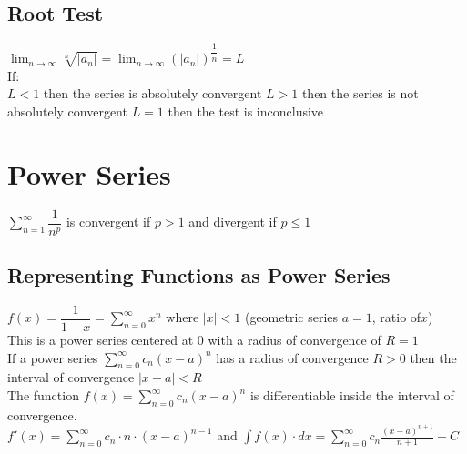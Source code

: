 \documentclass{article}
\begin{document}
\subsection*{Root Test}
$\displaystyle \lim_{n\to\infty}\sqrt[n]{|a_n|}=\lim_{n\to\infty}(|a_n|)^{\dfrac{1}{n} }=L$\\
If:\\
\indent $L<1$ then the series is absolutely convergent
\indent $L>1$ then the series is not absolutely convergent
\indent $L=1$ then the test is inconclusive
\section{Power Series}
$\displaystyle \sum^\infty_{n=1}\dfrac{1}{n^p}$ is convergent if $p>1$ and divergent if $p\le 1$
\subsection*{Representing Functions as Power Series}
$\displaystyle f(x)=\dfrac{1}{1-x}=\sum^\infty_{n=0}x^n$ where $|x|<1$ (geometric series $a=1$, ratio of$x$)\\
This is a power series centered at 0 with a radius of convergence of $R=1$\\
If a power series $\displaystyle \sum^\infty_{n=0}c_n(x-a)^n$ has a radius of convergence $R>0$ then the interval of convergence $\left| x-a \right|<R$\\
The function $f(x)=\displaystyle \sum^\infty_{n=0}c_n(x-a)^n$ is differentiable inside the interval of convergence.\\
$f'(x)=\displaystyle \sum^\infty_{n=0}c_n \cdot n \cdot (x-a)^{n-1}$ and $\int f(x)\cdot dx = \displaystyle \sum^\infty_{n=0}c_n\frac{(x-a)^{n+1} }{n+1}+C$
\end{document}
